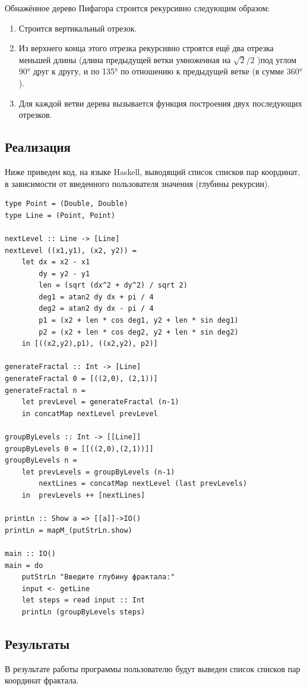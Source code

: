 \documentclass[10pt,a4paper,final]{article} %
\begin{document}
Обнажённое дерево Пифагора строится рекурсивно следующим образом:
\begin{enumerate}[itemsep=0pt]
	\item Строится вертикальный отрезок.
	\item Из верхнего конца этого отрезка рекурсивно строятся ещё два отрезка меньшей длины (длина предыдущей ветки умноженная на $\sqrt{2}/2$ )под углом 90° друг к другу, и по 135°  по отношению к предыдущей ветке (в сумме 360° ). 
	\item Для каждой ветви дерева вызывается функция построения двух последующих отрезков.
\end{enumerate}

\subsection{Реализация}

Ниже приведен код, на языке Haskell, выводящий список списков пар координат, в зависимости от введенного пользователя значения (глубины рекурсии).

\begin{lstlisting}
type Point = (Double, Double)
type Line = (Point, Point)

nextLevel :: Line -> [Line]
nextLevel ((x1,y1), (x2, y2)) = 
	let dx = x2 - x1
		dy = y2 - y1
		len = (sqrt (dx^2 + dy^2) / sqrt 2) 
		deg1 = atan2 dy dx + pi / 4
		deg2 = atan2 dy dx - pi / 4
		p1 = (x2 + len * cos deg1, y2 + len * sin deg1)
		p2 = (x2 + len * cos deg2, y2 + len * sin deg2)
	in [((x2,y2),p1), ((x2,y2), p2)]

generateFractal :: Int -> [Line]
generateFractal 0 = [((2,0), (2,1))]
generateFractal n = 
	let prevLevel = generateFractal (n-1)
	in concatMap nextLevel prevLevel

groupByLevels :: Int -> [[Line]]
groupByLevels 0 = [[((2,0),(2,1))]]
groupByLevels n = 
	let prevLevels = groupByLevels (n-1)
		nextLines = concatMap nextLevel (last prevLevels)
	in  prevLevels ++ [nextLines] 

printLn :: Show a => [[a]]->IO()
printLn = mapM_(putStrLn.show)

main :: IO()
main = do
	putStrLn "Введите глубину фрактала:"
	input <- getLine
	let steps = read input :: Int
	printLn (groupByLevels steps)
\end{lstlisting}

\subsection{Результаты}
В результате работы программы пользователю будут выведен список списков пар координат фрактала. 
\end{document}
